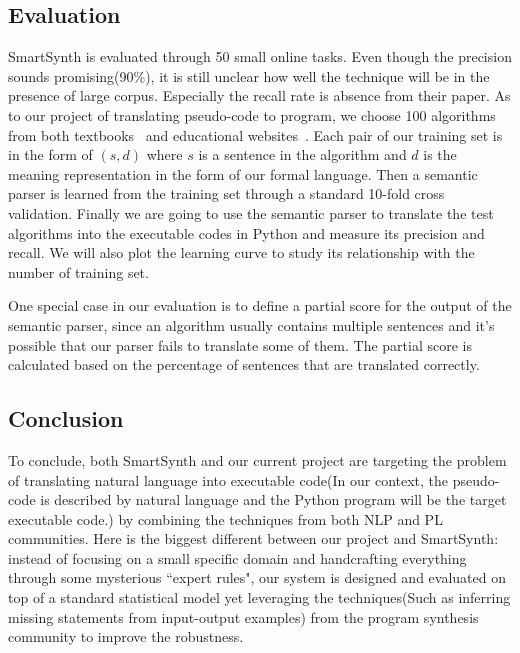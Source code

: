 \documentclass[10pt]{article}
\begin{document}
\subsection{Evaluation}
SmartSynth is evaluated through 50 small online tasks. Even though 
the precision sounds promising(90\%), it is still unclear how well the 
technique will be in the presence of large corpus. Especially the recall
rate is absence from their paper. As to our project of translating pseudo-code to 
program, we choose 100 algorithms from both textbooks~\cite{taocp} and educational websites~\cite{codebat}. Each
pair of our training set is in the form of $(s,d)$ where $s$ is 
a sentence in the algorithm and $d$ is the meaning representation in the form 
of our formal language. Then a semantic parser is learned from the training
set through a standard 10-fold cross validation. Finally we are going to 
use the semantic parser to translate the test algorithms into the executable
codes in Python and measure its precision and recall. 
We will also plot the learning curve to study its relationship with 
the number of training set.  

One special case in our evaluation is to define a partial score for the output 
of the semantic parser, since an algorithm usually contains multiple sentences 
and it's possible that our parser fails to translate some of them. The partial
score is calculated based on the percentage of sentences that are translated
correctly.  

\subsection{Conclusion}
To conclude, both SmartSynth and our current project are targeting the problem 
of translating natural language into executable code(In our context, the pseudo-code
is described by natural language and the Python program will be the target
executable code.) by combining the techniques
from both NLP and PL communities. Here is the biggest different between our 
project and SmartSynth: instead of focusing on a small specific domain
and handcrafting everything through some mysterious ``expert rules", our system
is designed and evaluated on top of a standard statistical model yet leveraging
the techniques(Such as inferring missing statements from input-output examples) 
from the program synthesis community to improve the robustness.



\end{document}
